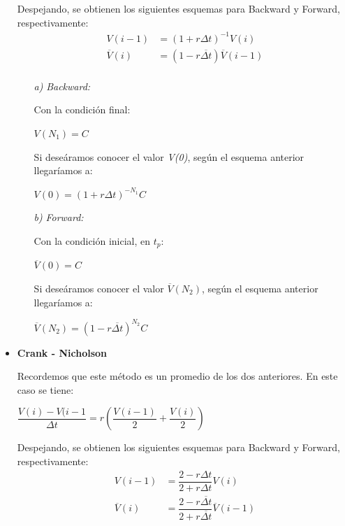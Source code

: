 \documentclass[titlepage]{article}
\begin{document}
\begin{itemize}
	Despejando, se obtienen los siguientes esquemas para Backward y Forward, respectivamente:
		\begin{align*}
			V(i - 1) &= (1 + r \Delta t)^{-1}V(i) \\
			\overline{V}(i) &= (1 - r \overline{\Delta t}) \overline{V}(i - 1) \\
		\end{align*}
		
		\begin{itemize}
			\item[\textit{a)}] \textit{Backward:}
			
			\vspace{5pt}
			Con la condición final:
				\begin{center}
					$V(N_{1}) = C$
				\end{center}
			Si deseáramos conocer el valor \textit{V(0)}, según el esquema anterior llegaríamos a:
				\begin{center}
					$V(0) = (1 + r \Delta t)^{-N_{1}} C$
				\end{center}
			
			\item[\textit{b)}] \textit{Forward:}
			
			\vspace{5pt}
			Con la condición inicial, en $t_{p}$:
				\begin{center}
					$\overline{V}(0) = C$
				\end{center}
			Si deseáramos conocer el valor $\overline{V}(N_{2})$, según el esquema anterior llegaríamos a:
				\begin{center}
					$\overline{V}(N_{2}) = (1 - r \overline{\Delta t})^{N_{2}} C$
				\end{center}
		\end{itemize}
	
	\item \textbf{Crank - Nicholson}

	\vspace{5pt}
	Recordemos que este método es un promedio de los dos anteriores. En este caso se tiene:
	
		\begin{center}
			$\dfrac{V(i) - V(i-1}{\Delta t} = r \left(\dfrac{V(i-1)}{2} + \dfrac{V(i)}{2} \right)$
		\end{center}
	
	Despejando, se obtienen los siguientes esquemas para Backward y Forward, respectivamente:
		\begin{align*}
			V(i - 1) &= \dfrac{2 - r \Delta t}{2 + r \Delta t} V(i) \\
			\overline{V}(i) &= \dfrac{2 - r \overline{\Delta t}}{2 + r \overline{\Delta t}} \overline{V}(i - 1) \\
		\end{align*}
	

\end{itemize}
\end{document}
